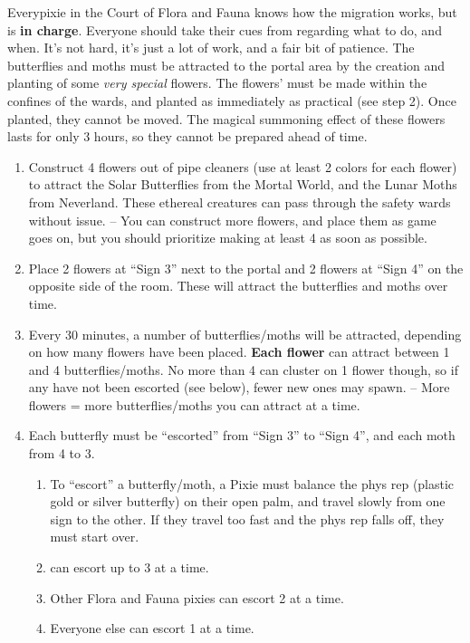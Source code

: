 \documentclass[green]{PP}
\begin{document}
\name{\gButterfly{}}

Everypixie in the Court of Flora and Fauna knows how the migration works, but \cFButterfly{} is \textbf{in charge}. Everyone should take their cues from \cFButterfly{\them} regarding what to do, and when. It’s not hard, it’s just a lot of work, and a fair bit of patience. The butterflies and moths must be attracted to the portal area by the creation and planting of some \textit{very special} flowers. The flowers' must be made within the confines of the wards, and planted as immediately as practical (see step 2). Once planted, they cannot be moved. The magical summoning effect of these flowers lasts for only 3 hours, so they cannot be prepared ahead of time.

\begin{enumerate}
	\item Construct 4 flowers out of pipe cleaners (use at least 2 colors for each flower) to attract the Solar Butterflies from the Mortal World, and the Lunar Moths from Neverland. These ethereal creatures can pass through the safety wards without issue. -- You can construct more flowers, and place them as game goes on, but you should prioritize making at least 4 as soon as possible.
	\item Place 2 flowers at “Sign 3” next to the portal and 2 flowers at “Sign 4” on the opposite side of the room. These will attract the butterflies and moths over time.
	\item Every 30 minutes, a number of butterflies/moths will be attracted, depending on how many flowers have been placed. \textbf{Each flower} can attract between 1 and 4 butterflies/moths. No more than 4 can cluster on 1 flower though, so if any have not been escorted (see below), fewer new ones may spawn. -- More flowers = more butterflies/moths you can attract at a time.
	\item Each butterfly must be “escorted” from “Sign 3” to “Sign 4”, and each moth from 4 to 3.
	\begin{enumerate}
		\item To “escort” a butterfly/moth, a Pixie must balance the phys rep (plastic gold or silver butterfly) on their open palm, and travel slowly from one sign to the other. If they travel too fast and the phys rep falls off, they must start over.
		\item \cFButterfly{} can escort up to 3 at a time.
		\item Other Flora and Fauna pixies can escort 2 at a time.
		\item Everyone else can escort 1 at a time.

\end{enumerate}
\end{enumerate}
\end{document}
